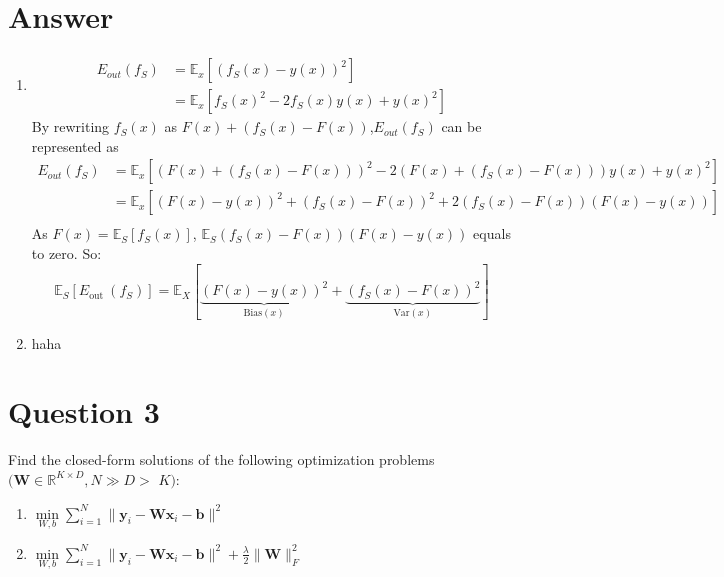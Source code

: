 \documentclass[
	12pt, %
]{fphw}
\begin{document}
\section*{Answer}
\begin{enumerate}
\item 
\begin{equation*}
	\begin{aligned}
		E_{out}(f_S) &= \mathbb{E}_x[(f_S(x)-y(x))^2] \\
		 &= \mathbb{E}_x[f_S(x)^2-2f_S(x)y(x)+y(x)^2]
	\end{aligned}
\end{equation*}
By rewriting $f_S(x)$ as $F(x)+(f_S(x)-F(x))$,$E_{out}(f_S)$ can be represented as 
\begin{equation*}
	\begin{aligned}
	E_{out}(f_S)&=\mathbb{E}_x[(F(x)+(f_S(x)-F(x)))^2-2(F(x)+(f_S(x)-F(x)))y(x)+y(x)^2] \\
	            &=\mathbb{E}_x[(F(x)-y(x))^2+(f_S(x)-F(x))^2+2(f_S(x)-F(x))(F(x)-y(x))] \\
	\end{aligned}
\end{equation*}
As $F(x)=\mathbb{E}_{S}\left[f_{S}(x)\right]$, $\mathbb{E}_{S}(f_S(x)-F(x))(F(x)-y(x))$ equals to zero. So:
\begin{equation*}
	\mathbb{E}_{S}\left[E_{\mathrm{out}}\:(f_{S})\right]=\mathbb{E}_{X}[\underbrace{(F(x)-y(x))^{2}}_{\mathrm{Bias}(x)}+\underbrace{(f_{S}(x)-F(x))^2}_{\mathrm{Var}(x)}]
\end{equation*}
\item haha
\end{enumerate}
\section*{Question 3}

\begin{problem}
	Find the closed-form solutions of the following optimization problems $(\mathbf{W}\in\mathbb{R}^{K\times D},N\gg D>$ $K)\colon$
	\medskip
    \begin{enumerate}
		\itemsep0.3em
		\parskip0.3em
		
	\item $\underset{W, b}{\min}\sum _{i= 1}^N\|\mathbf{y} _i- \mathbf{W} \mathbf{x} _i- \mathbf{b} \|^2$  
	\item $\underset{W, b}{\min}\sum _{i= 1}^N\|\mathbf{y} _i- \mathbf{W} \mathbf{x} _i- \mathbf{b} \|^2+ \frac \lambda2\|\mathbf{W} \|_F^2$
\end{enumerate}
\end{problem}
\end{document}
